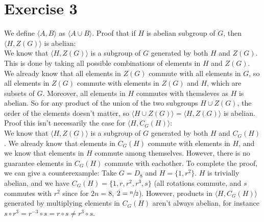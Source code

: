 \documentclass[12pt]{article}
\begin{document}
    
    \section*{Exercise 3}
    We define $\langle A, B \rangle$ as $\langle A \cup B \rangle$.
    Proof that if $H$ is abelian subgroup of $G$,
    then $\langle H, Z(G) \rangle$ is abelian: \\
    We know that $\langle H, Z(G) \rangle$
    is a subgroup of $G$ generated by both $H$ and $Z(G)$.
    This is done by taking all possible combinations
    of elements in $H$ and $Z(G)$.
    We already know that all elements in $Z(G)$
    commute with all elements in $G$,
    so all elements in $Z(G)$ commute with elements in $Z(G)$
    and $H$,
    which are subsets of $G$.
    Moreover, all elements in $H$ commutes with themsleves
    as $H$ is abelian.
    So for any product of the union of the two subgroups $H \cup Z(G)$,
    the order of the elements doesn't matter,
    so $\langle H \cup Z(G) \rangle = \langle H, Z(G) \rangle$
    is abelian. \\
    Proof this isn't necessarily the case for $\langle H, C_G(H) \rangle$: \\
    We know that $\langle H, Z(G) \rangle$
    is a subgroup of $G$ generated by both $H$ and $C_G(H)$.
    We already know that elements in $C_G(H)$ commute with elements
    in $H$,
    and we know that elements in $H$ commute among themselves.
    However, there is no guarantee elements in $C_G(H)$
    commute with eachother.
    To complete the proof, we can give a counterexample:
    Take $G = D_8$ and $H = \{1, r^2\}$.
    $H$ is trivially abelian,
    and we have $C_G(H) = \{1, r, r^2, r^3, s\}$
    (all rotations commute, and $s$ commutes with $r^2$
    since for $2n = 8$, $2 = \sfrac{n}{2}$).
    However, products in $\langle H, C_G(H) \rangle$
    generated by multiplying elements in $C_G(H)$ aren't always abelian,
    for instance
    $s \circ r^3 = r^{-3} \circ s = r \circ s \neq r^3 \circ s$.
\end{document}
